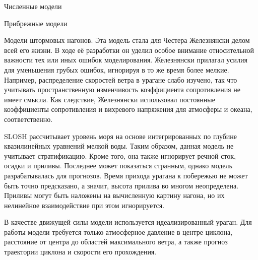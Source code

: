 \begin{chapter}{Численные модели}
\begin{section}{Прибрежные модели}
\begin{paragraph}{Модели штормовых нагонов.}
Эта модель стала для Честера Железнянски делом всей его жизни. 
В ходе её разработки он уделил особое внимание относительной важности 
тех или иных ошибок моделирования. Железнянски прилагал усилия для
уменьшения грубых ошибок, игнорируя в то же время более мелкие.
Например, распределение скоростей ветра в урагане слабо изучено,
так что учитывать пространственную изменчивость коэффициента сопротивления%
 не имеет смысла. Как следствие,
Железнянски использовал постоянные коэффициенты сопротивления и вихревого
напряжения для атмосферы и океана, соответственно.
%

SLOSH рассчитывает уровень моря на основе интегрированных по глубине
квазилинейных уравнений мелкой воды. Таким образом, данная модель не
учитывает стратификацию. Кроме того, она также игнорирует речной сток, осадки
и приливы. Последнее может показаться странным, однако модель
разрабатывалась для прогнозов. Время прихода урагана к побережью не может
быть точно предсказано, а значит, высота прилива во многом неопределена. 
Приливы могут быть наложены на вычисленную
картину нагона, но их нелинейное взаимодействие при этом игнорируется.
%

В качестве движущей силы модели используется идеализированный ураган.
Для работы модели требуется только атмосферное давление в центре циклона,
расстояние от центра до областей максимального ветра, а также прогноз
траектории циклона и скорости его прохождения.  
%


\end{paragraph}
\end{section}
\end{chapter}
